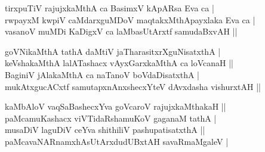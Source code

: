 \begin{entry}
\smallskip
\begin{shl}
tirxpuTiV rajujxkaMthA ca BasimxV kApARsa Eva ca |\\[1pt]
rwpayxM kwpiV caMdarxguMDoV maqtakxMthApayxlaka Eva ca |\\[1pt]
vasanoV muMDi KaDigxV ca laMbasUtArxtf samudaBxvAH ||
\end{shl}
\medskip
{}
\smallskip
\begin{shl}
goVNikaMthA tathA daMtiV jaTharasitxrXguNisatxthA |\\[1pt]
keVshakaMthA lalATashacx vAyxGarxkaMthA ca loVcanaH ||\\[1pt]
BaginiV jAlakaMthA ca naTanoV boVdaDisatxthA |\\[1pt]
mukAtxgucACxtf samutapxnAnxshecxYteV dAvxdasha vishurxtAH ||
\end{shl}
\medskip
{}
\smallskip
\begin{shl}
kaMbAloV vaqSaBashecxYva goVcaroV rajujxkaMthakaH ||\\[1pt]
paMcamuKashacx viVTidaRshamuKoV gaganaM tathA |\\[1pt]
musaDiV laguDiV ceYva shithiliV pashupatisatxthA ||\\[1pt]
paMcavaNARnamxhAsUtArxdudUBxtAH savaRmaMgaleV |
\end{shl}
\medskip
{}
\end{entry}


